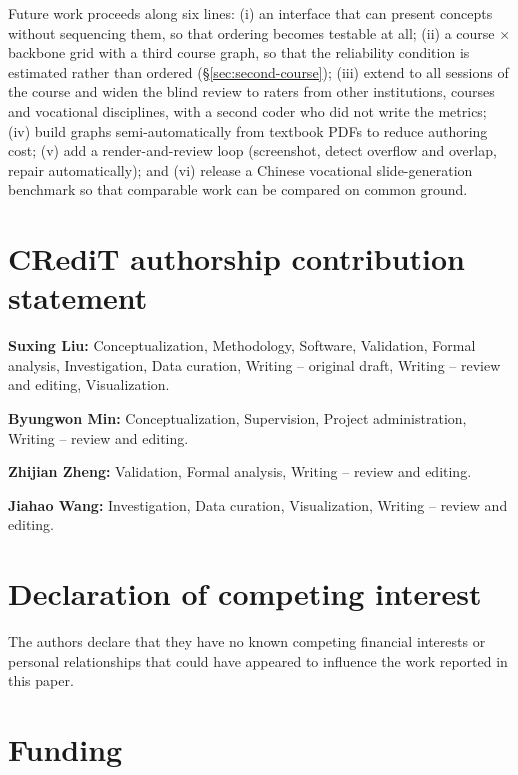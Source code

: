 \documentclass[review,12pt]{elsarticle}
\renewcommand{\_}{\kgunderscore\allowbreak}
\begin{document}
Future work proceeds along six lines: (i) an interface that can present concepts
without sequencing them, so that ordering becomes testable at all; (ii) a
course $\times$ backbone grid with a third course graph, so that the reliability
condition is estimated rather than ordered (\S\ref{sec:second-course});
(iii) extend to all sessions of the course and widen the blind review to raters
from other institutions, courses and vocational disciplines, with a second coder
who did not write the metrics; (iv) build graphs semi-automatically from
textbook PDFs to reduce authoring cost; (v) add a render-and-review loop
(screenshot, detect overflow and overlap, repair automatically); and (vi) release
a Chinese vocational slide-generation benchmark so that comparable work can be
compared on common ground.

\section*{CRediT authorship contribution statement}

\textbf{Suxing Liu:} Conceptualization, Methodology, Software, Validation,
Formal analysis, Investigation, Data curation, Writing -- original draft,
Writing -- review and editing, Visualization.

\textbf{Byungwon Min:} Conceptualization, Supervision, Project administration,
Writing -- review and editing.

\textbf{Zhijian Zheng:} Validation, Formal analysis, Writing -- review and
editing.

\textbf{Jiahao Wang:} Investigation, Data curation, Visualization, Writing --
review and editing.

\section*{Declaration of competing interest}

The authors declare that they have no known competing financial interests or
personal relationships that could have appeared to influence the work reported
in this paper.

\section*{Funding}
\end{document}
